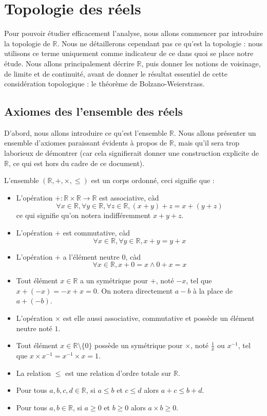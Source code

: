 \section{Topologie des réels}

Pour pouvoir étudier efficacement l'analyse, nous allons commencer par introduire la topologie de $\mathbb R$. Nous ne détaillerons cependant pas ce qu'est la topologie : nous utilisons ce terme uniquement comme indicateur de ce dans quoi se place notre étude. Nous allons principalement décrire $\mathbb R$, puis donner les notions de voisinage, de limite et de continuité, avant de donner le résultat essentiel de cette considération topologique : le théorème de Bolzano-Weierstrass.

\subsection{Axiomes des l'ensemble des réels}

D'abord, nous allons introduire ce qu'est l'ensemble $\mathbb R$. Nous allons présenter un ensemble d'axiomes paraissant évidents à propos de $\mathbb R$, mais qu'il sera trop laborieux de démontrer (car cela signifierait donner une construction explicite de $\mathbb R$, ce qui est hors du cadre de ce document).

\begin{ax}
    L'ensemble $(\mathbb R,+,\times,\leq)$ est un corps ordonné, ceci signifie que :
    \begin{itemize}[label=$\bullet$]
        \item L'opération $+ : \mathbb R \times \mathbb R \to \mathbb R$ est associative, càd $$\forall x\in \mathbb R, \forall y \in\mathbb R, \forall z\in\mathbb R, (x+y)+z = x+(y+z)$$ ce qui signifie qu'on notera indifféremment $x+y+z$.
        \item L'opération $+$ est commutative, càd $$\forall x\in\mathbb R,\forall y\in \mathbb R, x+y=y+x$$
        \item L'opération $+$ a l'élément neutre $0$, càd $$\forall x\in\mathbb R, x+0=x \land 0+x = x$$
        \item Tout élément $x\in\mathbb R$ a un symétrique pour $+$, noté $-x$, tel que $x+(-x)=-x+x = 0$. On notera directement $a-b$ à la place de $a+(-b)$.
        \item L'opération $\times$ est elle aussi associative, commutative et possède un élément neutre noté $1$.
        \item Tout élément $x\in\mathbb R \setminus\{0\}$ possède un symétrique pour $\times$, noté $\frac{1}{x}$ ou $x^{-1}$, tel que $x\times x^{-1}=x^{-1}\times x = 1$.
        \item La relation $\leq$ est une relation d'ordre totale sur $\mathbb R$.
        \item Pour tous $a,b,c,d\in\mathbb R$, si $a\leq b$ et $c\leq d$ alors $a+c\leq b+d$.
        \item Pour tous $a,b\in\mathbb R$, si $a\geq 0$ et $b\geq 0$ alors $a\times b\geq 0$.
    \end{itemize}
\end{ax}

